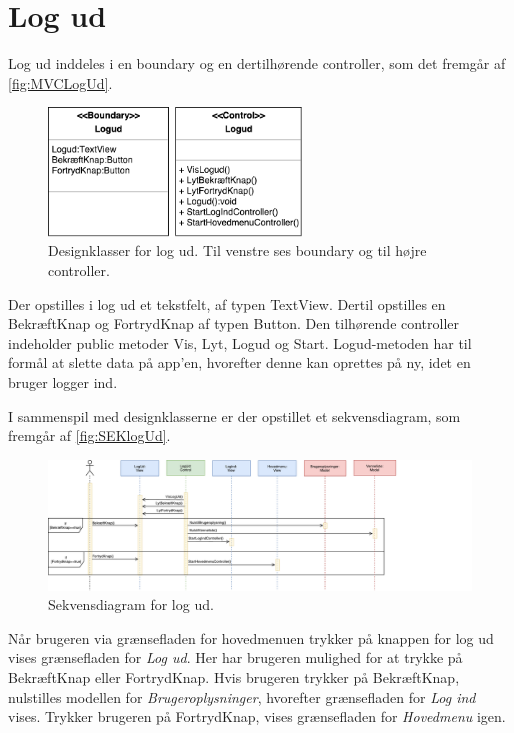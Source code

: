 \section*{Log ud}
Log ud inddeles i en boundary og en dertilhørende controller, som det fremgår af \autoref{fig:MVCLogUd}. 

\begin{figure} [H]
\centering
\includegraphics[width=0.6\textwidth]{figures/MVC/Logud}
\caption{Designklasser for log ud. Til venstre ses boundary og til højre controller.}
\label{fig:MVCLogUd}
\end{figure}

\noindent
Der opstilles i log ud et tekstfelt, af typen TextView. Dertil opstilles en BekræftKnap og FortrydKnap af typen Button. 
Den tilhørende controller indeholder public metoder Vis, Lyt, Logud og Start. Logud-metoden har til formål at slette data på app'en, hvorefter denne kan oprettes på ny, idet en bruger logger ind. 

I sammenspil med designklasserne er der opstillet et sekvensdiagram, som fremgår af \autoref{fig:SEKlogUd}.

\begin{figure} [H]
\centering
\includegraphics[width=1.28\textwidth]{figures/Sek/SEKLogUd}
\caption{Sekvensdiagram for log ud.}
\label{fig:SEKlogUd}
\end{figure}

\noindent
Når brugeren via grænsefladen for hovedmenuen trykker på knappen for log ud vises grænsefladen for \textit{Log ud}. Her har brugeren mulighed for at trykke på BekræftKnap eller FortrydKnap. Hvis brugeren trykker på BekræftKnap, nulstilles modellen for \textit{Brugeroplysninger}, hvorefter grænsefladen for \textit{Log ind} vises. Trykker brugeren på FortrydKnap, vises grænsefladen for \textit{Hovedmenu} igen. 
